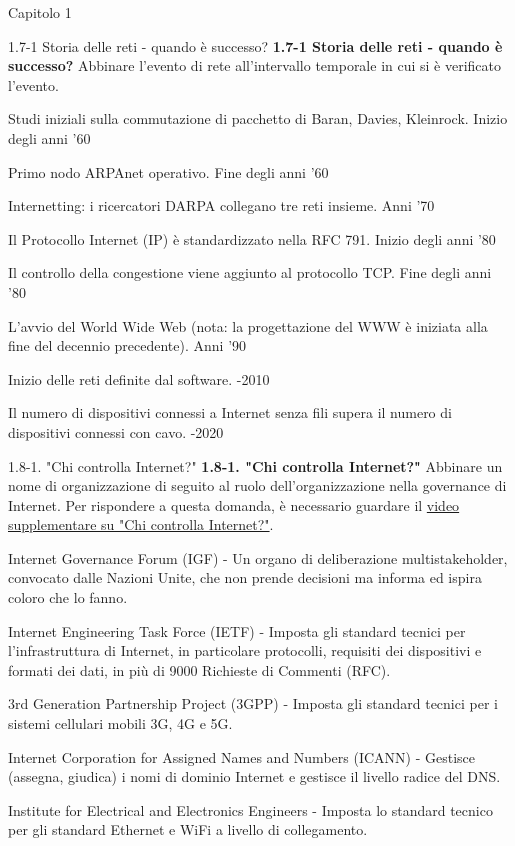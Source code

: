 \documentclass[a4paper]{article}
\begin{document}
\begin{quiz}{Capitolo 1}
\begin{matching}[points=1]{1.7-1 Storia delle reti - quando è successo?}
\textbf{1.7-1 Storia delle reti - quando è successo?}
Abbinare l'evento di rete all'intervallo temporale in cui si è verificato l'evento.

\item Studi iniziali sulla commutazione di pacchetto di Baran, Davies, Kleinrock. \answer Inizio degli anni '60
\item Primo nodo ARPAnet operativo. \answer Fine degli anni '60
\item Internetting: i ricercatori DARPA collegano tre reti insieme. \answer Anni '70
\item Il Protocollo Internet (IP) è standardizzato nella RFC 791. \answer Inizio degli anni '80
\item Il controllo della congestione viene aggiunto al protocollo TCP. \answer Fine degli anni '80
\item L'avvio del World Wide Web (nota: la progettazione del WWW è iniziata alla fine del decennio precedente). \answer Anni '90
\item Inizio delle reti definite dal software. -2010
\item Il numero di dispositivi connessi a Internet senza fili supera il numero di dispositivi connessi con cavo. -2020
\end{matching}

\begin{matching}[points=1]{1.8-1. "Chi controlla Internet?"}
\textbf{1.8-1. "Chi controlla Internet?"}
Abbinare un nome di organizzazione di seguito al ruolo dell'organizzazione nella governance di Internet. Per rispondere a questa domanda, è necessario guardare il \href{https://www.youtube.com/watch?v=xrd4hD_9fS8}{video supplementare su "Chi controlla Internet?"}.

\item Internet Governance Forum (IGF) - Un organo di deliberazione multistakeholder, convocato dalle Nazioni Unite, che non prende decisioni ma informa ed ispira coloro che lo fanno.
\item Internet Engineering Task Force (IETF) - Imposta gli standard tecnici per l'infrastruttura di Internet, in particolare protocolli, requisiti dei dispositivi e formati dei dati, in più di 9000 Richieste di Commenti (RFC).
\item 3rd Generation Partnership Project (3GPP) - Imposta gli standard tecnici per i sistemi cellulari mobili 3G, 4G e 5G.
\item Internet Corporation for Assigned Names and Numbers (ICANN) - Gestisce (assegna, giudica) i nomi di dominio Internet e gestisce il livello radice del DNS.
\item Institute for Electrical and Electronics Engineers - Imposta lo standard tecnico per gli standard Ethernet e WiFi a livello di collegamento.
\end{matching}


\end{quiz}
\end{document}
